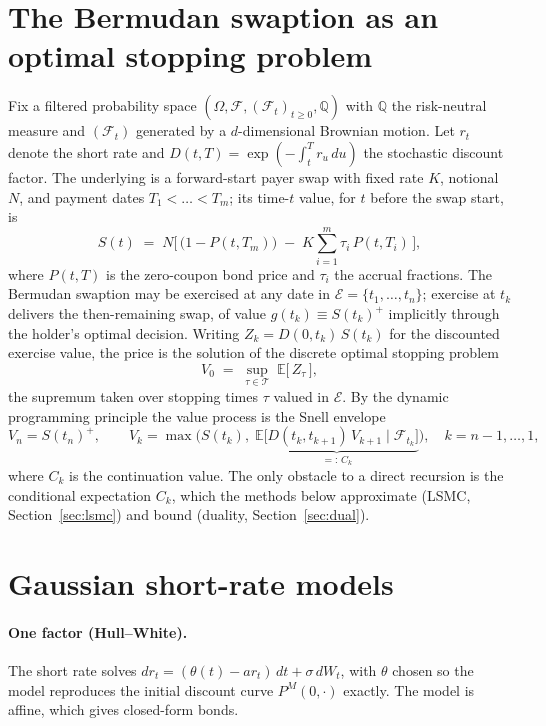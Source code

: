 \documentclass[11pt]{article}
\theoremstyle{plain}
\theoremstyle{definition}
\newcommand{\E}{\mathbb{E}}
\newcommand{\F}{\mathcal{F}}
\begin{document}
\section{The Bermudan swaption as an optimal stopping problem}
\label{sec:stop}

Fix a filtered probability space $(\Omega,\F,(\F_t)_{t\ge0},\mathbb{Q})$ with $\mathbb{Q}$ the
risk-neutral measure and $(\F_t)$ generated by a $d$-dimensional Brownian motion. Let
$r_t$ denote the short rate and $D(t,T)=\exp(-\int_t^T r_u\,du)$ the stochastic discount
factor. The underlying is a forward-start payer swap with fixed rate $K$, notional $N$, and
payment dates $T_1<\dots<T_m$; its time-$t$ value, for $t$ before the swap start, is
\begin{equation}
\label{eq:swap}
S(t) \;=\; N\Big[\,\big(1-P(t,T_m)\big)\;-\;K\sum_{i=1}^{m}\tau_i\,P(t,T_i)\,\Big],
\end{equation}
where $P(t,T)$ is the zero-coupon bond price and $\tau_i$ the accrual fractions. The Bermudan
swaption may be exercised at any date in $\mathcal{E}=\{t_1,\dots,t_n\}$; exercise at $t_k$
delivers the then-remaining swap, of value $g(t_k)\equiv S(t_k)^+$ implicitly through the
holder's optimal decision. Writing $Z_k = D(0,t_k)\,S(t_k)$ for the discounted exercise value,
the price is the solution of the discrete optimal stopping problem
\begin{equation}
\label{eq:value}
V_0 \;=\; \sup_{\tau\in\mathcal{T}}\;\E\big[\,Z_\tau\,\big],
\end{equation}
the supremum taken over stopping times $\tau$ valued in $\mathcal{E}$. By the dynamic
programming principle the value process is the Snell envelope
\begin{equation}
\label{eq:dpp}
V_n = S(t_n)^+,\qquad
V_k = \max\!\Big(S(t_k),\; \underbrace{\E\big[D(t_k,t_{k+1})\,V_{k+1}\mid\F_{t_k}\big]}_{=:\,C_k}\Big),
\quad k=n-1,\dots,1,
\end{equation}
where $C_k$ is the continuation value. The only obstacle to a direct recursion is the
conditional expectation $C_k$, which the methods below approximate (LSMC, Section~\ref{sec:lsmc})
and bound (duality, Section~\ref{sec:dual}).

\section{Gaussian short-rate models}
\label{sec:models}

\paragraph{One factor (Hull--White).} The short rate solves
$dr_t = (\theta(t)-a r_t)\,dt + \sigma\,dW_t$, with $\theta$ chosen so the model reproduces the
initial discount curve $P^M(0,\cdot)$ exactly. The model is affine, which gives closed-form
bonds.
\end{document}
